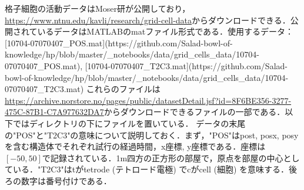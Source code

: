 格子細胞の活動データはMoser研が公開しており，\url{https://www.ntnu.edu/kavli/research/grid-cell-data}からダウンロードできる．公開されているデータはMATLABのmatファイル形式である．使用するデータ：[10704-07070407_POS.mat](https://github.com/Salad-bowl-of-knowledge/hp/blob/master/_notebooks/data/grid_cells_data/10704-07070407_POS.mat), [10704-07070407_T2C3.mat](https://github.com/Salad-bowl-of-knowledge/hp/blob/master/_notebooks/data/grid_cells_data/10704-07070407_T2C3.mat)
これらのファイルは\url{https://archive.norstore.no/pages/public/datasetDetail.jsf?id=8F6BE356-3277-475C-87B1-C7A977632DA7}からダウンロードできるファイルの一部である．以下ではディレクトリの下にファイルを置いている．
データの末尾の"POS"と"T2C3"の意味について説明しておく．まず，"POS"はpost, posx, posyを含む構造体でそれぞれ試行の経過時間，x座標, y座標である．座標は$[-50, 50]$で記録されている．1m四方の正方形の部屋で，原点を部屋の中心としている．"T2C3"はtがtetrode (テトロード電極) でcがcell (細胞) を意味する．後ろの数字は番号付けである． 
